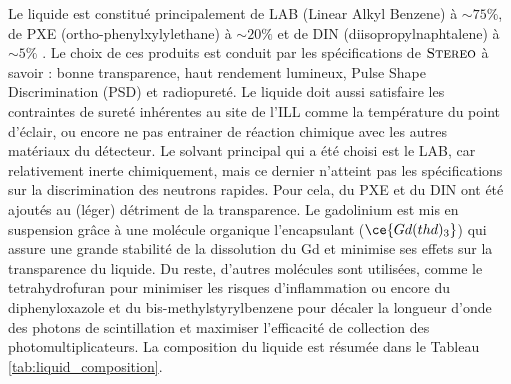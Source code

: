 Le liquide est constitué principalement de LAB (Linear Alkyl Benzene) à $\sim 75 \%$, de PXE (ortho-phenylxylylethane) à $\sim 20 \%$ et de DIN (diisopropylnaphtalene) à $\sim 5 \%$ \cite{Buck:2018cac}. Le choix de ces produits est conduit par les spécifications de $\textsc{Stereo}$ à savoir : bonne transparence, haut rendement lumineux, Pulse Shape Discrimination (PSD) et radiopureté. Le liquide doit aussi satisfaire les contraintes de sureté inhérentes au site de l'ILL comme la température du point d'éclair, ou encore ne pas entrainer de réaction chimique avec les autres matériaux du détecteur. Le solvant principal qui a été choisi est le LAB, car relativement inerte chimiquement, mais ce dernier n'atteint pas les spécifications sur la discrimination des neutrons rapides. Pour cela, du PXE et du DIN ont été ajoutés au (léger) détriment de la transparence. Le gadolinium est mis en suspension grâce à une molécule organique l'encapsulant ($\ce{Gd(thd)_3}$) qui assure une grande stabilité de la dissolution du Gd et minimise ses effets sur la transparence du liquide. Du reste, d'autres molécules sont utilisées, comme le tetrahydrofuran pour minimiser les risques d'inflammation ou encore du diphenyloxazole et du bis-methylstyrylbenzene pour décaler la longueur d'onde des photons de scintillation et maximiser l'efficacité de collection des photomultiplicateurs. La composition du liquide est résumée dans le Tableau \ref{tab:liquid_composition}.\\ 


